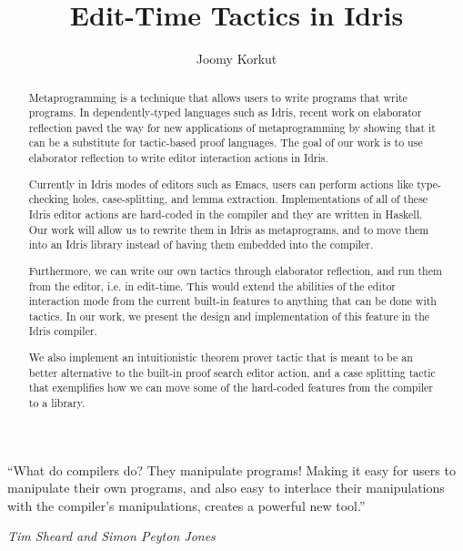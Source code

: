 \documentclass[11pt, ma]{westhesis}
\title{Edit-Time Tactics in Idris}
\author{Joomy Korkut}
\theoremstyle{plain}
\theoremstyle{definition}
\numberwithin{section}{chapter}
\numberwithin{figure}{chapter}
\begin{document}
\begin{abstract}
  Metaprogramming is a technique that allows users to write programs that
  write programs. In dependently-typed languages such as Idris, recent work on
  elaborator reflection paved the way for new applications of metaprogramming
  by showing that it can be a substitute for tactic-based proof languages.
  The goal of our work is to use elaborator reflection to write editor
  interaction actions in Idris.

  Currently in Idris modes of editors such as Emacs, users can perform actions
  like type-checking holes, case-splitting, and lemma extraction.
  Implementations of all of these Idris editor actions are hard-coded in the
  compiler and they are written in Haskell. Our work will allow us to rewrite
  them in Idris as metaprograms, and to move them into an Idris library instead
  of having them embedded into the compiler.

  Furthermore, we can write our own tactics through elaborator
  reflection, and run them from the editor, i.e. in edit-time.
  This would extend the abilities of the editor interaction mode from the
  current built-in features to anything that can be done with tactics.
  In our work, we present the design and implementation of this feature in the
  Idris compiler.

  We also implement an intuitionistic theorem prover tactic that is meant to be an
  better alternative to the built-in proof search editor action, and a case
  splitting tactic that exemplifies how we can move some of the hard-coded
  features from the compiler to a library.
\end{abstract}

\begin{dedication}
  \epigraph{``What do compilers do? They manipulate programs! Making it easy
  for users to manipulate their own programs, and also easy to interlace their
  manipulations with the compiler’s manipulations, creates a powerful new
  tool.''}{\textit{Tim Sheard and Simon Peyton Jones}\cite{th}}
\end{dedication}
\end{document}
